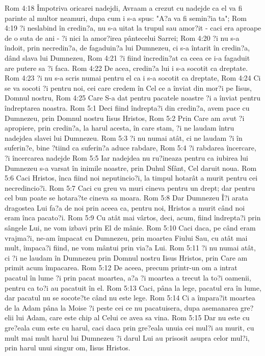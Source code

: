 Rom 4:18  Împotriva oricarei nadejdi, Avraam a crezut cu nadejde ca el va fi parinte al multor neamuri, dupa cum i s-a spus: "A?a va fi semin?ia ta";
Rom 4:19  ?i neslabind în credin?a, nu s-a uitat la trupul sau amor?it - caci era aproape de o suta de ani - ?i nici la amor?irea pântecelui Sarrei;
Rom 4:20  ?i nu s-a îndoit, prin necredin?a, de fagaduin?a lui Dumnezeu, ci s-a întarit în credin?a, dând slava lui Dumnezeu,
Rom 4:21  ?i fiind încredin?at ca ceea ce i-a fagaduit are putere sa ?i faca.
Rom 4:22  De acea, credin?a lui i s-a socotit ca dreptate.
Rom 4:23  ?i nu s-a scris numai pentru el ca i s-a socotit ca dreptate,
Rom 4:24  Ci se va socoti ?i pentru noi, cei care credem în Cel ce a înviat din mor?i pe Iisus, Domnul nostru,
Rom 4:25  Care S-a dat pentru pacatele noastre ?i a înviat pentru îndreptarea noastra.
Rom 5:1  Deci fiind îndrepta?i din credin?a, avem pace cu Dumnezeu, prin Domnul nostru Iisus Hristos,
Rom 5:2  Prin Care am avut ?i apropiere, prin credin?a, la harul acesta, în care stam, ?i ne laudam întru nadejdea slavei lui Dumnezeu.
Rom 5:3  ?i nu numai atât, ci ne laudam ?i în suferin?e, bine ?tiind ca suferin?a aduce rabdare,
Rom 5:4  ?i rabdarea încercare, ?i încercarea nadejde
Rom 5:5  Iar nadejdea nu ru?ineaza pentru ca iubirea lui Dumnezeu s-a varsat în inimile noastre, prin Duhul Sfânt, Cel daruit noua.
Rom 5:6  Caci Hristos, înca fiind noi neputincio?i, la timpul hotarât a murit pentru cei necredincio?i.
Rom 5:7  Caci cu greu va muri cineva pentru un drept; dar pentru cel bun poate se hotara?te cineva sa moara.
Rom 5:8  Dar Dumnezeu Î?i arata dragostea Lui fa?a de noi prin aceea ca, pentru noi, Hristos a murit când noi eram înca pacato?i.
Rom 5:9  Cu atât mai vârtos, deci, acum, fiind îndrepta?i prin sângele Lui, ne vom izbavi prin El de mânie.
Rom 5:10  Caci daca, pe când eram vrajma?i, ne-am împacat cu Dumnezeu, prin moartea Fiului Sau, cu atât mai mult, împaca?i fiind, ne vom mântui prin via?a Lui.
Rom 5:11  ?i nu numai atât, ci ?i ne laudam în Dumnezeu prin Domnul nostru Iisus Hristos, prin Care am primit acum împacarea.
Rom 5:12  De aceea, precum printr-un om a intrat pacatul în lume ?i prin pacat moartea, a?a ?i moartea a trecut la to?i oamenii, pentru ca to?i au pacatuit în el.
Rom 5:13  Caci, pâna la lege, pacatul era în lume, dar pacatul nu se socote?te când nu este lege.
Rom 5:14  Ci a împara?it moartea de la Adam pâna la Moise ?i peste cei ce nu pacatuisera, dupa asemanarea gre?elii lui Adam, care este chip al Celui ce avea sa vina.
Rom 5:15  Dar nu este cu gre?eala cum este cu harul, caci daca prin gre?eala unuia cei mul?i au murit, cu mult mai mult harul lui Dumnezeu ?i darul Lui au prisosit asupra celor mul?i, prin harul unui singur om, Iisus Hristos.
